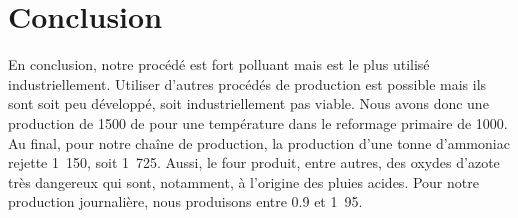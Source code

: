 \section{Conclusion}
En conclusion, notre procédé est fort polluant mais est le plus
utilisé industriellement. Utiliser d'autres procédés de production
est possible mais ils sont soit peu développé, soit industriellement
pas viable. Nous avons donc une production de \unit{1500}{\ton\per\dday}
de  pour une température dans le reformage primaire
de \unit{1000}{\kelvin}. Au final, pour notre chaîne de production,
la production d'une tonne d'ammoniac rejette \unit{1.150}{\ton}, soit
\unit{1.725}{\ton\per\dday}. Aussi, le four produit, entre autres,
des oxydes d'azote très dangereux qui sont, notamment, à l'origine
des pluies acides. Pour notre production journalière, nous produisons
entre 0.9 et \unit{1.95}{\ton\per\dday}.

